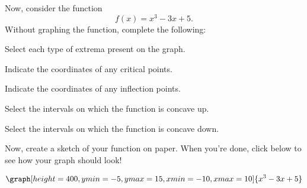 \documentclass{ximera}
\begin{document}
\begin{question}
Now, consider the function $$f(x)=x^3-3x+5\text{.}$$ Without graphing the function, complete the following:

Select each type of extrema present on the graph.
\begin{selectAll}
\end{selectAll}

Indicate the coordinates of any critical points.
\begin{selectAll}
\end{selectAll}

Indicate the coordinates of any inflection points.
\begin{selectAll}
\end{selectAll}

Select the intervals on which the function is concave up.
\begin{selectAll}
\choice{$[-5,10]$}
\choice{$[1,2]$}
\end{selectAll}

Select the intervals on which the function is concave down.

\begin{selectAll}
\choice{$[0,10]$}
\choice{$[1,2]$}
\choice{$[0,\infty)$}
\choice[correct]{$(-\infty,0]$}
\end{selectAll}

Now, create a sketch of your function on paper. When you're done, click below to see how your graph should look!

\begin{multipleChoice}
\end{multipleChoice}
\begin{feedback}[correct]
\[
\graph[height=400,ymin=-5,ymax=15,xmin=-10,xmax=10]{x^3-3x+5}
\]
\end{feedback}
\end{question}
\end{document}
